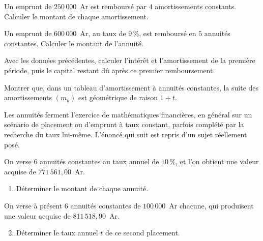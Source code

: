 \begin{entrainement}
\exo[\niveau{1}] Un emprunt de $250\,000$~Ar est remboursé par $4$
amortissements constants. Calculer le montant de chaque amortissement.

\exo[\niveau{2}] Un emprunt de $600\,000$~Ar, au taux de $9\,\%$, est
remboursé en $5$ annuités constantes. Calculer le montant de l'annuité.

\exo[\niveau{2}] Avec les données précédentes, calculer l'intérêt et
l'amortissement de la première période, puis le capital restant dû après ce
premier remboursement.

\exo[\niveau{3}] Montrer que, dans un tableau d'amortissement à annuités
constantes, la suite des amortissements $\left(m_{k}\right)$ est
géométrique de raison $1+t$.
\end{entrainement}

\begin{annales}
Les annuités ferment l'exercice de mathématiques financières, en général sur
un scénario de placement ou d'emprunt à taux constant, parfois complété par
la recherche du taux lui-même. L'énoncé qui suit est repris d'un sujet
réellement posé.

On verse $6$ annuités constantes au taux annuel de $10\,\%$, et l'on obtient
une valeur acquise de $771\,561{,}00$~Ar.
\begin{enumerate}[label=\textbf{\alph*)}, leftmargin=*, itemsep=0.15em]
  \item Déterminer le montant de chaque annuité.
\end{enumerate}

On verse à présent $6$ annuités constantes de $100\,000$~Ar chacune, qui
produisent une valeur acquise de $811\,518{,}90$~Ar.
\begin{enumerate}[label=\textbf{\alph*)}, leftmargin=*, itemsep=0.15em]
  \setcounter{enumii}{1}
  \item Déterminer le taux annuel $t$ de ce second placement.
\end{enumerate}
\end{annales}

